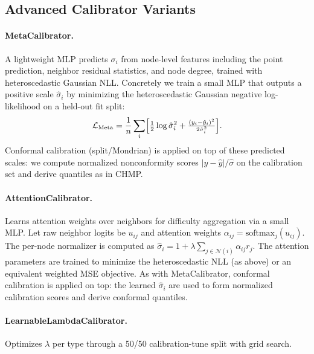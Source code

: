 \documentclass[twoside,11pt]{article}
\begin{document}
\subsection{Advanced Calibrator Variants}

\paragraph{MetaCalibrator.} A lightweight MLP predicts $\sigma_i$ from
node-level features including the point prediction, neighbor residual
statistics, and node degree, trained with heteroscedastic Gaussian NLL.
Concretely we train a small MLP that outputs a positive scale $\hat{\sigma}_i$ by
minimizing the heteroscedastic Gaussian negative log-likelihood on a held-out
fit split:
\begin{equation}
\mathcal{L}_{\mathrm{Meta}} = \frac{1}{n}\sum_i \Bigl[\tfrac{1}{2}\log\hat{\sigma}_i^2 + \tfrac{(y_i-\hat{y}_i)^2}{2\hat{\sigma}_i^2}\Bigr].
\end{equation}
Conformal calibration (split/Mondrian) is applied on top of these predicted
scales: we compute normalized nonconformity scores $|y-\hat{y}|/\hat{\sigma}$ on
the calibration set and derive quantiles as in CHMP.

\paragraph{AttentionCalibrator.} Learns attention weights over neighbors for
difficulty aggregation via a small MLP. Let raw neighbor logits be $u_{ij}$ and
attention weights $\alpha_{ij}=\mathrm{softmax}_j(u_{ij})$. The per-node
normalizer is computed as $\hat{\sigma}_i = 1 + \lambda \sum_{j\in\mathcal{N}(i)}\alpha_{ij} r_j$.
The attention parameters are trained to minimize the heteroscedastic NLL (as
above) or an equivalent weighted MSE objective. As with MetaCalibrator,
conformal calibration is applied on top: the learned $\hat{\sigma}_i$ are used
to form normalized calibration scores and derive conformal quantiles.

\paragraph{LearnableLambdaCalibrator.} Optimizes $\lambda$ per type through a
50/50 calibration-tune split with grid search.
\end{document}
